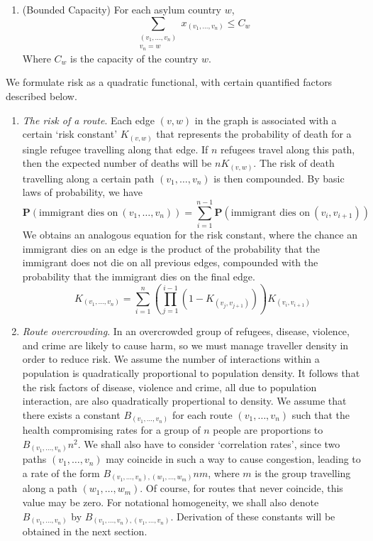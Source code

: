 \documentclass{article}
\begin{document}
\begin{enumerate}
\begin{enumerate}
    \item (Bounded Capacity) For each asylum country $w$,
    \[ \sum_{\substack{(v_1, \dots, v_n) \\ v_n = w}} x_{(v_1, \dots, v_n)} \leq C_w \]
    Where $C_w$ is the capacity of the country $w$.
\end{enumerate}

We formulate risk as a quadratic functional, with certain quantified factors described below.

\begin{enumerate}
    \item {\it The risk of a route}. Each edge $(v,w)$ in the graph is associated with a certain `risk constant' $K_{(v,w)}$ that represents the probability of death for a single refugee travelling along that edge. If $n$ refugees travel along this path, then the expected number of deaths will be $n K_{(v,w)}$. The risk of death travelling along a certain path $(v_1, \dots, v_n)$ is then compounded. By basic laws of probability, we have
    \[ \mathbf{P}(\text{immigrant dies on}\ (v_1, \dots, v_n)) = \sum_{i = 1}^{n-1} \mathbf{P}(\text{immigrant dies on}\ (v_i, v_{i+1})) \]
    We obtains an analogous equation for the risk constant, where the chance an immigrant dies on an edge is the product of the probability that the immigrant does not die on all previous edges, compounded with the probability that the immigrant dies on the final edge.
    \[ K_{(v_1, \dots, v_n)} = \sum_{i = 1}^n \left( \prod_{j = 1}^{i-1} \left(1 - K_{(v_j,v_{j+1})} \right) \right) K_{(v_i, v_{i+1})} \]

    \item {\it Route overcrowding}. In an overcrowded group of refugees, disease, violence, and crime are likely to cause harm, so we must manage traveller density in order to reduce risk. We assume the number of interactions within a population is quadratically proportional to population density. It follows that the risk factors of disease, violence and crime, all due to population interaction, are also quadratically propertional to density. We assume that there exists a constant $B_{(v_1, \dots, v_n)}$ for each route $(v_1, \dots, v_n)$ such that the health compromising rates for a group of $n$ people are proportions to $B_{(v_1, \dots, v_n)} n^2$. We shall also have to consider `correlation rates', since two paths $(v_1, \dots, v_n)$ may coincide in such a way to cause congestion, leading to a rate of the form $B_{(v_1, \dots, v_n), (w_1, \dots, w_m)} n m$, where $m$ is the group travelling along a path $(w_1, \dots, w_m)$. Of course, for routes that never coincide, this value may be zero. For notational homogeneity, we shall also denote $B_{(v_1, \dots, v_n)}$ by $B_{(v_1, \dots, v_n), (v_1, \dots, v_n)}$. Derivation of these constants will be obtained in the next section.
\end{enumerate}


\end{enumerate}
\end{document}

